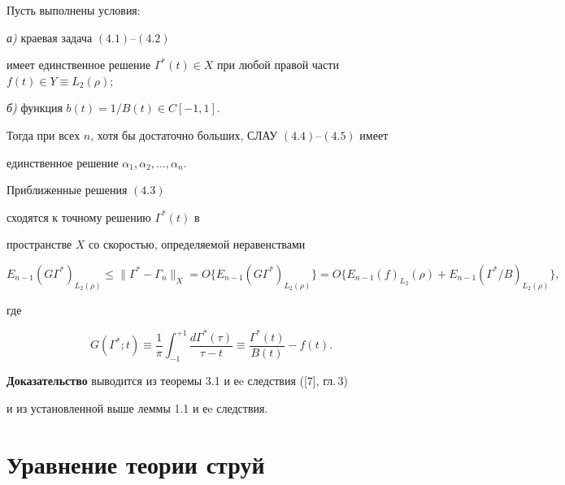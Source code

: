 \begin{thms}


Пусть выполнены условия${:}$





{\em а)} краевая задача $(4.1)$--$(4.2)$


имеет единственное решение $\Gamma^*(t)\in


X$ при любой правой части $f(t)\in Y\equiv L_2(\rho);$


{\em б)} функция $b(t)=1/B(t) \in C[-1,1]$.





Тогда при всех $n$, хотя бы достаточно больших, СЛАУ $(4.4)$--$(4.5)$ имеет


единственное решение  $\alpha_1,\alpha_2,\dotsc,\alpha_n$.


Приближенные решения $(4.3)$


сходятся к точному решению $\Gamma^*(t)$ в


пространстве $X$ со скоростью, определяемой неравенствами


$$


E_{n-1}(G\Gamma^*)_{L_2(\rho)}\le \|\Gamma^*-\Gamma_n\|_X=


O\{E_{n-1}(G\Gamma^*)_{L_2(\rho)}


\}=O\{E_{n-1}(f)_{L_2}(\rho)+


E_{n-1}\left(\Gamma^*/B\right)_{L_2(\rho)}\},


$$


где


$$


G(\Gamma^*;t)\equiv \frac{1}{\pi}


\int_{-1}^{+1}\frac{d\Gamma^*(\tau)}{\tau-t}\equiv


\frac{\Gamma^*(t)}{B(t)}-f(t).


$$


\end{thms}





{\bf Доказательство} выводится из теоремы 3.1 и еe следствия ([7], гл.\,3)


и из установленной выше леммы 1.1 и еe следствия.





\section{Уравнение теории струй}





